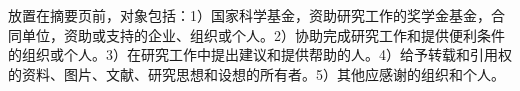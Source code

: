 \begin{thanks}
\noindent 放置在摘要页前，对象包括：1）国家科学基金，资助研究工作的奖学金基金，合同单位，资助或支持的企业、组织或个人。2）协助完成研究工作和提供便利条件的组织或个人。3）在研究工作中提出建议和提供帮助的人。4）给予转载和引用权的资料、图片、文献、研究思想和设想的所有者。5）其他应感谢的组织和个人。
\end{thanks}